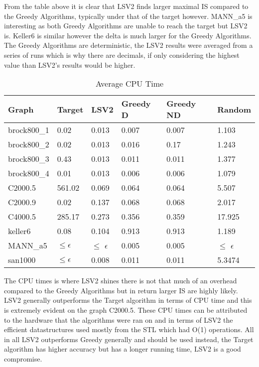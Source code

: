 \documentclass[conference]{IEEEtran}
\begin{document}
From the table above it is clear that LSV2 finds larger maximal IS compared to the Greedy Algorithms, typically under that of the target however.
MANN\_a5 is interesting as both Greedy Algorithms are unable to reach the target but LSV2 is. Keller6 is similar however
the delta is much larger for the Greedy Algorithms. The Greedy Algorithms are deterministic, the LSV2 results were averaged
from a series of runs which is why there are decimals, if only considering the highest value than LSV2's results would be higher.

\begin{table}[h]
\caption{Average CPU Time}
\label{tab:my-tableCPU}
\begin{tabular}{|l|l|l|l|l|l|}
\hline
Graph       & Target       & LSV2         & Greedy D & Greedy ND & Random       \\ \hline
brock800\_1 & 0.02         & 0.013        & 0.007    & 0.007     & 1.103        \\ \hline
brock800\_2 & 0.02         & 0.013        & 0.016    & 0.17      & 1.243        \\ \hline
brock800\_3 & 0.43         & 0.013        & 0.011    & 0.011     & 1.377        \\ \hline
brock800\_4 & 0.01         & 0.013        & 0.006    & 0.006     & 1.079        \\ \hline
C2000.5     & 561.02       & 0.069        & 0.064    & 0.064     & 5.507        \\ \hline
C2000.9     & 0.02         & 0.137        & 0.068    & 0.068     & 2.017        \\ \hline
C4000.5     & 285.17       & 0.273        & 0.356    & 0.359     & 17.925       \\ \hline
keller6     & 0.08         & 0.104        & 0.913    & 0.913     & 1.189        \\ \hline
MANN\_a5    & $\le$$\epsilon$ & $\le$ $\epsilon$ & 0.005    & 0.005     & $\le$ $\epsilon$ \\ \hline
san1000     & $\le$$\epsilon$ & 0.008        & 0.011    & 0.011     & 5.3474       \\ \hline
\end{tabular}
\end{table}

The CPU times is where LSV2 shines there is not that much of an overhead compared to the Greedy Algorithms but in return 
larger IS are highly likely. LSV2 generally outperforms the Target algorithm in terms of CPU time and this is extremely evident
on the graph C2000.5. These CPU times can be attributed to the hardware that the algorithms were ran on and in terms of LSV2
the efficient datastructures used mostly from the STL which had O(1) operations. All in all LSV2 outperforms Greedy generally
and should be used instead, the Target algorithm has higher accuracy but has a longer running time, LSV2 is a good compromise.
\end{document}
